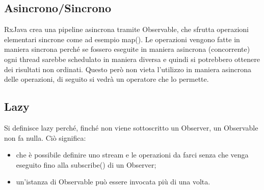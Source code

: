 \documentclass{article}
\begin{document}
\subsection{Asincrono/Sincrono}
RxJava crea una pipeline asincrona tramite Observable, che sfrutta operazioni elementari sincrone come ad esempio map(). Le operazioni vengono fatte in maniera sincrona perché se fossero eseguite in maniera asincrona (concorrente) ogni thread sarebbe schedulato in maniera diversa e quindi si potrebbero ottenere dei risultati non ordinati. Questo però non vieta l’utilizzo in maniera asincrona delle operazioni, di seguito si vedrà un operatore che lo permette.
\subsection{Lazy}
Si definisce lazy perché, finché non viene sottoscritto un Observer, un Observable non fa nulla. Ciò significa:
\begin{itemize}
    \item che è possibile definire uno stream e le operazioni da farci senza che venga eseguito fino alla subscribe() di un Observer;
    \item un’istanza di Observable può essere invocata più di una volta.
\end{itemize}
\end{document}
